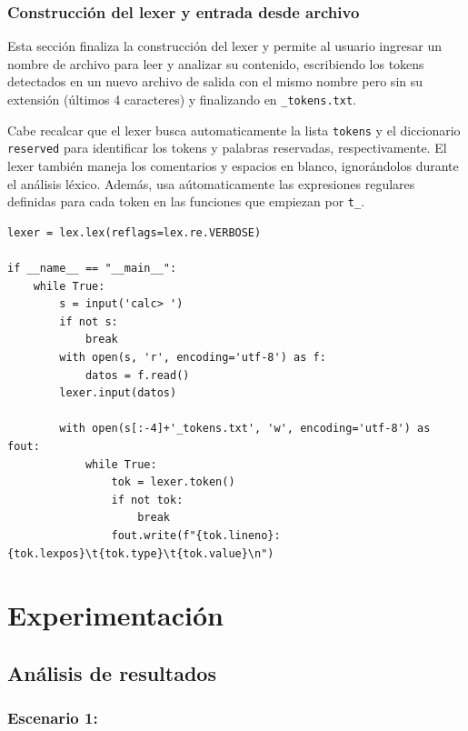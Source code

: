 \documentclass{article}
\begin{document}
\subsubsection{Construcción del lexer y entrada desde archivo}

Esta sección finaliza la construcción del lexer y permite al usuario ingresar un nombre de archivo para leer y analizar su contenido, escribiendo los tokens detectados en un nuevo archivo de salida con el mismo nombre pero sin su extensión (últimos 4 caracteres) y finalizando en \texttt{\_tokens.txt}.

Cabe recalcar que el lexer busca automaticamente la lista \texttt{tokens} y el diccionario \texttt{reserved} para identificar los tokens y palabras reservadas, respectivamente. El lexer también maneja los comentarios y espacios en blanco, ignorándolos durante el análisis léxico. Además, usa aútomaticamente las expresiones regulares definidas para cada token en las funciones que empiezan por \texttt{t\_}.

\begin{lstlisting}[style=mypython]
lexer = lex.lex(reflags=lex.re.VERBOSE)

if __name__ == "__main__":
    while True:
        s = input('calc> ')
        if not s:
            break
        with open(s, 'r', encoding='utf-8') as f:
            datos = f.read()
        lexer.input(datos)

        with open(s[:-4]+'_tokens.txt', 'w', encoding='utf-8') as fout:
            while True:
                tok = lexer.token()
                if not tok:
                    break
                fout.write(f"{tok.lineno}:{tok.lexpos}\t{tok.type}\t{tok.value}\n")
\end{lstlisting}



\section{Experimentación}\label{sec:exp}

\subsection{Análisis de resultados}

\subsubsection{Escenario 1: }
\end{document}
